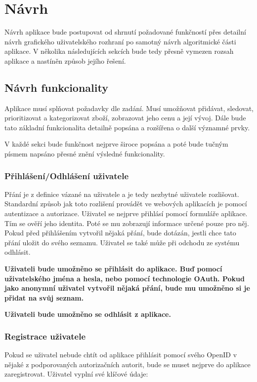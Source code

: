 \chapter{Návrh}
Návrh aplikace bude postupovat od shrnutí požadované funkčností přes detailní návrh grafického uživatelského rozhraní po samotný návrh algoritmické části aplikace. V několika následujících sekcích bude tedy přesně vymezen rozsah aplikace a nastíněn způsob jejího řešení.

\section{Návrh funkcionality}
\label{sec:navrh-funkcionality}
Aplikace musí splňovat požadavky dle zadání. Musí umožňovat přidávat, sledovat, prioritizovat a kategorizovat zboží, zobrazovat jeho cenu a její vývoj. Dále bude tato základní funkcionalita detailně popsána a rozšířena o další významné prvky.

V každé sekci bude funkčnost nejprve široce popsána a poté bude tučným písmem napsáno přesné znění výsledné funkcionality.

\subsection{Přihlášení/Odhlášení uživatele}
Přání je z definice vázané na uživatele a je tedy nezbytné uživatele rozlišovat. Standardní způsob jak toto rozlišení provádět ve webových aplikacích je pomocí autentizace a autorizace. Uživatel se nejprve přihlásí pomocí formuláře aplikace. Tím se ověří jeho identita. Poté se mu zobrazují informace určené pouze pro něj. Pokud před přihlášením vytvořil nějaká přání, bude dotázán, jestli chce tato přání uložit do svého seznamu. Uživatel se také může při odchodu ze systému odhlásit.

\textbf{Uživateli bude umožněno se přihlásit do aplikace. Buď pomocí uživatelského jména a hesla, nebo pomocí technologie OAuth. Pokud jako anonymní uživatel vytvořil nějaká přání, bude mu umožněno si je přidat na svůj seznam.}

\textbf{Uživateli bude umožněno se odhlásit z aplikace.}

\subsection{Registrace uživatele}
Pokud se uživatel nebude chtít od aplikace přihlásit pomocí svého OpenID v nějaké z podporovaných autorizačních autorit, bude se muset nejprve do aplikace zaregistrovat. Uživatel vyplní své klíčové údaje:

